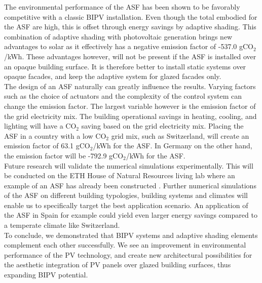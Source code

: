 
The environmental performance of the ASF has been shown to be favorably competitive with a classic BIPV installation. Even though the total embodied for the ASF are high, this is offset through energy savings by adaptive shading. This combination of adaptive shading with photovoltaic generation brings new advantages to solar as it effectively has a negative emission factor of -537.0 gCO${_2}$/kWh. These advantages however, will not be present if the ASF is installed over an opaque building surface. It is therefore better to install static systems over opaque facades, and keep the adaptive system for glazed facades only.\\

The design of an ASF naturally can greatly influence the results. Varying factors such as the choice of actuators and the complexity of the control system can change the emission factor. The largest variable however is the emission factor of the grid electricity mix. The building operational savings in heating, cooling, and lighting will have a CO${_2}$ saving based on the grid electricity mix. Placing the ASF in a country with a low CO${_2}$ grid mix, such as Switzerland, will create an emission factor of 63.1 gCO${_2}$/kWh for the ASF. In Germany on the other hand, the emission factor will be -792.9 gCO${_2}$/kWh for the ASF.\\

Future research will validate the numerical simulations experimentally. This will be conducted on the ETH House of Natural Resources living lab where an example of an ASF has already been constructed \cite{nagy2015frontiers}. Further numerical simulations of the ASF on different building typologies, building systems and climates will enable us to specifically target the best application scenario. An application of the ASF in Spain for example could yield even larger energy savings compared to a temperate climate like Switzerland.\\

To conclude, we demonstrated that BIPV systems and adaptive shading elements complement each other successfully. We see an improvement in environmental performance of the PV technology, and create new architectural possibilities for the aesthetic integration of PV panels over glazed building surfaces, thus expanding BIPV potential. 





